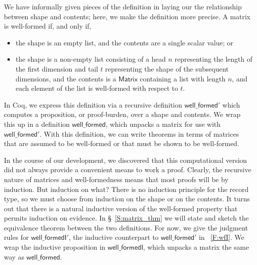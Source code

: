 \documentclass[11pt,conference]{IEEEtran}
\newcommand{\func}[1]{\mathsf{#1}}
\theoremstyle{plain} %
\theoremstyle{definition}
\theoremstyle{remark}
\begin{document}
We have informally given pieces of the definition in laying our the relationship
between shape and contents; here, we make the definition more precise. A matrix
is well-formed if, and only if,
\begin{itemize}
    \item the shape is an empty list, and the contents are a single scalar value;
        or
    \item the shape is a non-empty list consisting of a head \(n\) representing
        the length of the first dimension and tail \(t\) representing the shape
        of the subsequent dimensions, and the contents is a \(\func{Matrix}\)
        containing a list with length \(n\), and each element of the list is
        well-formed with respect to \(t\).
\end{itemize}
In Coq, we express this definition via a recursive definition
\(\func{well\_formed'}\) which computes a proposition, or proof-burden, over a
shape and contents. We wrap this up in a definition \(\func{well\_formed}\),
which unpacks a matrix for use with \(\func{well\_formed'}\). With this
definition, we can write theorems in terms of matrices that are assumed to be
well-formed or that must be shown to be well-formed.

In the course of our development, we discovered that this computational version
did not always provide a convenient means to work a proof. Clearly, the
recursive nature of matrices and well-formedness means that most proofs will be
by induction. But induction on what? There is no induction principle for the
record type, so we must choose from induction on the shape or on the contents.
It turns out that there is a natural inductive version of the well-formed
property that permits induction on evidence. In \S~\ref{S:matrix_thm} we will
state and sketch the equivalence theorem between the two definitions. For now,
we give the judgment rules for \(\func{well\_formedI'}\), the inductive
counterpart to \(\func{well\_formed'}\) in \figurename~\ref{F:wfI}. We wrap the
inductive proposition in \(\func{well\_formedI}\), which unpacks a matrix the
same way as \(\func{well\_formed}\).
\end{document}
